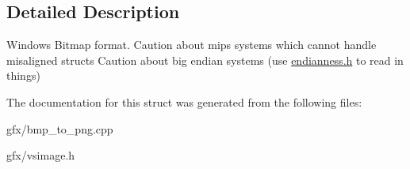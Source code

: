 \subsection{Detailed Description}
Windows Bitmap format. Caution about mips systems which cannot handle misaligned structs Caution about big endian systems (use \hyperlink{endianness_8h_source}{endianness.\+h} to read in things) 

The documentation for this struct was generated from the following files\+:\begin{DoxyCompactItemize}
\item 
gfx/bmp\+\_\+to\+\_\+png.\+cpp\item 
gfx/vsimage.\+h\end{DoxyCompactItemize}
